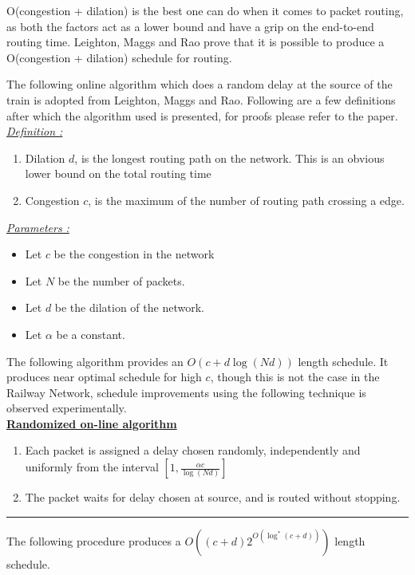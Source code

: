 \documentclass[twoside,11pt]{article}
\begin{document}
O(congestion + dilation) is the best one can do when it comes to packet routing, as both the factors act as a lower bound and have a grip on the end-to-end routing time. Leighton, Maggs and Rao \cite{LMR} prove that it is possible to produce a O(congestion + dilation) schedule for routing.

The following online algorithm which does a random delay at the source of the train is adopted from Leighton, Maggs and Rao. Following are a few definitions after which the algorithm used is presented, for proofs please refer to the paper. \\

\noindent \underline{\emph{Definition :}}
\begin{enumerate}
	\item Dilation $d$, is the longest routing path on the network. This is an obvious lower bound on the total routing time
	\item Congestion $c$, is the maximum of the number of routing path crossing a edge.
\end{enumerate}

\noindent \underline{\em Parameters :} 

\begin{itemize}
	\item Let $c$ be the congestion in the network
	\item Let $N$ be the number of packets.
	\item Let $d$ be the dilation of the network.
	\item Let $\alpha$ be a constant.
\end{itemize}
\noindent The following algorithm provides an $O(c + d \log(N d))$ length schedule. It produces near optimal schedule for high $c$, though this is not the case in the Railway Network, schedule improvements using the following technique is observed experimentally.\\

\underline{\bf Randomized on-line algorithm}
\begin{framed}
\begin{enumerate}
\item Each packet is assigned a delay chosen randomly, independently and uniformly
	  from the interval $ [ 1 , \frac{\alpha c}{\log(N d)} ] $
\item The packet waits for delay chosen at source, and is routed without stopping.
\end{enumerate}
\end{framed} 
\hrule 
\vspace{0.1in}
\noindent The following procedure produces a $O((c+d)2^{O(\log^*(c+d))})$ length schedule. \\
\end{document}
